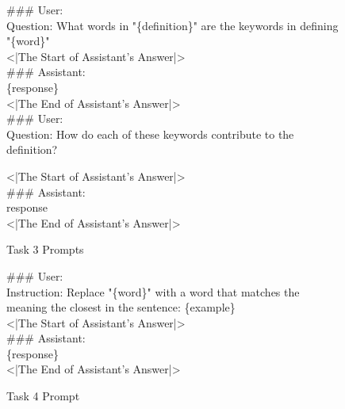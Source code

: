 \documentclass{brandeis-thesis3.2}
\theoremstyle{plain}
\theoremstyle{definition}
\theoremstyle{remark}
\numberwithin{equation}{section}
\begin{document}
\begin{figure}[h!]
\centering
\begin{tcolorbox}[promptbox]

\#\#\# User:\\
Question: What words in "\{definition\}" are the keywords in defining "\{word\}"\\

<|The Start of Assistant's Answer|>\\
\#\#\# Assistant:\\
\{response\}\\
<|The End of Assistant's Answer|>\\

\#\#\# User:\\
Question: How do each of these keywords contribute to the definition?

<|The Start of Assistant's Answer|>\\
\#\#\# Assistant:\\
{response}\\
<|The End of Assistant's Answer|>\\
\end{tcolorbox}
\label{fig:task_3}
\caption{Task 3 Prompts}
\end{figure}

\begin{figure}[h!]
\centering
\begin{tcolorbox}[promptbox]

\#\#\# User:\\
Instruction: Replace "\{word\}" with a word that matches the meaning the closest in the sentence: \{example\}\\

<|The Start of Assistant's Answer|>\\
\#\#\# Assistant:\\
\{response\}\\
<|The End of Assistant's Answer|>
\end{tcolorbox}
\label{fig:task_4}
\caption{Task 4 Prompt}
\end{figure}
\end{document}
